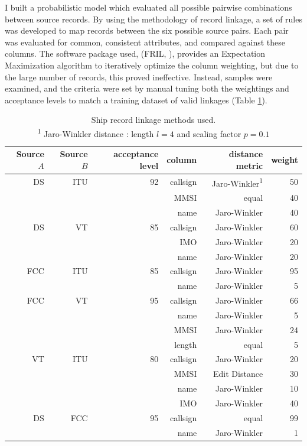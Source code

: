 I built a probabilistic model which evaluated all possible pairwise combinations between source records. By using the methodology of record linkage, a set of rules was developed to map records between the six possible source pairs. Each pair was evaluated for common, consistent attributes, and compared against these columns. The software package used, (FRIL, \citealp{Jurczyk2008fril}), provides an Expectation Maximization algorithm to iteratively optimize the column weighting, but due to the large number of records, this proved ineffective. Instead, samples were examined, and the criteria were set by manual tuning both the weightings and acceptance levels to match a training dataset of valid linkages (Table \ref{table:ships-record-linkage-methods}). 

\begin{table}[htbp]
  \begin{tabular}{rrrrrr} %
    \hline
    Source $A$ & Source $B$ & acceptance level & column & distance metric & weight \\
    \hline
     DS & ITU & 92 & callsign & Jaro-Winkler\textsuperscript{1} & 50 \\
        &     &    & MMSI & equal & 40 \\
        &     &    & name & Jaro-Winkler & 40 \\
     DS &  VT & 85 & callsign & Jaro-Winkler & 60 \\
        &     &    & IMO & Jaro-Winkler & 20 \\
        &     &    & name & Jaro-Winkler & 20 \\
    FCC & ITU & 85 & callsign & Jaro-Winkler & 95 \\
        &     &    & name & Jaro-Winkler & 5 \\
    FCC &  VT & 95 & callsign & Jaro-Winkler & 66 \\
        &     &    & name & Jaro-Winkler & 5 \\
        &     &    & MMSI & Jaro-Winkler & 24 \\
        &     &    & length & equal & 5 \\
     VT & ITU & 80 & callsign & Jaro-Winkler & 20 \\
        &     &    & MMSI & Edit Distance & 30 \\
        &     &    & name & Jaro-Winkler & 10 \\
        &     &    & IMO & Jaro-Winkler & 40 \\
     DS & FCC & 95 & callsign & equal & 99 \\
        &     &    & name & Jaro-Winkler& 1 \\
  \end{tabular}
  \caption{Ship record linkage methods used. \\
    \textsuperscript{1} Jaro-Winkler distance \citep{winkler1990string}: length $l = 4$ and scaling factor $p = 0.1$}
  \label{table:ships-record-linkage-methods}
\end{table}


